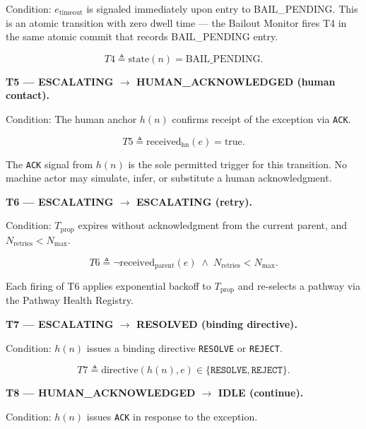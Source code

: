 Condition: $e_{\text{timeout}}$ is signaled immediately upon entry to BAIL\_PENDING. This is an atomic transition with zero dwell time — the Bailout Monitor fires T4 in the same atomic commit that records BAIL\_PENDING entry.

\begin{equation}
T4 \triangleq \text{state}(n) = \text{BAIL\_PENDING}. \tag{T4}
\end{equation}

\medskip\noindent\textbf{T5 — ESCALATING $\rightarrow$ HUMAN\_ACKNOWLEDGED (human contact).}

Condition: The human anchor $h(n)$ confirms receipt of the exception via \texttt{ACK}.

\begin{equation}
T5 \triangleq \text{received}_{\text{hn}}(e) = \text{true}. \tag{T5}
\end{equation}

The \texttt{ACK} signal from $h(n)$ is the sole permitted trigger for this transition. No machine actor may simulate, infer, or substitute a human acknowledgment.

\medskip\noindent\textbf{T6 — ESCALATING $\rightarrow$ ESCALATING (retry).}

Condition: $T_{\text{prop}}$ expires without acknowledgment from the current parent, and $N_{\text{retries}} < N_{\max}$.

\begin{equation}
T6 \triangleq \neg\text{received}_{\text{parent}}(e) \;\land\; N_{\text{retries}} < N_{\max}. \tag{T6}
\end{equation}

Each firing of T6 applies exponential backoff to $T_{\text{prop}}$ and re-selects a pathway via the Pathway Health Registry.

\medskip\noindent\textbf{T7 — ESCALATING $\rightarrow$ RESOLVED (binding directive).}

Condition: $h(n)$ issues a binding directive \texttt{RESOLVE} or \texttt{REJECT}.

\begin{equation}
T7 \triangleq \text{directive}(h(n), e) \in \{\texttt{RESOLVE}, \texttt{REJECT}\}. \tag{T7}
\end{equation}

\medskip\noindent\textbf{T8 — HUMAN\_ACKNOWLEDGED $\rightarrow$ IDLE (continue).}

Condition: $h(n)$ issues \texttt{ACK} in response to the exception.

